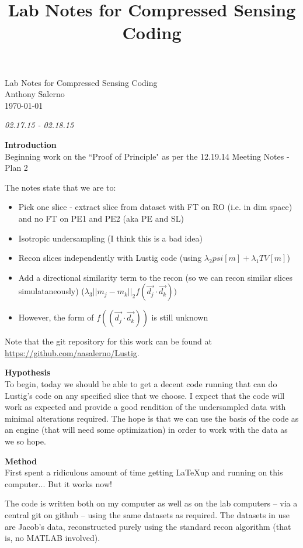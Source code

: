 \documentclass[pra,11 pt]{revtex4-1}
\title{Lab Notes for Compressed Sensing Coding}
\newcommand{\bo}{\noindent\textbf}
\begin{document}
\vfill

  \begin{titlepage}
    \vspace*{\fill}
    \begin{center}
      {\huge {Lab Notes for Compressed Sensing Coding}}\\[0.5cm]
      {\large {Anthony Salerno}}\\[0.4cm]
      \today
    \end{center}
    \vspace*{\fill}
  \end{titlepage}

\clearpage
\newpage

\noindent \emph{02.17.15 - 02.18.15}

\bo{Introduction}\\
Beginning work on the ``Proof of Principle" as per the 12.19.14 Meeting Notes - Plan 2

The notes state that we are to:
\begin{itemize}
  \item Pick one slice - extract slice from dataset with FT on RO (i.e. in dim space) and no FT on PE1 and PE2 (aka PE and SL)
  \item Isotropic undersampling (I think this is a bad idea)
  \item Recon slices independently with Lustig code (using $\lambda_2 psi[m] + \lambda_1 TV[m]$)
  \item Add a directional similarity term to the recon (so we can recon similar slices simulataneously) ($\lambda_3 ||m_j - m_k||_2 f(\vec{d_j} \cdot \vec{d_k}))$
  \item However, the form of $f((\vec{d_j}\cdot \vec{d_k}))$ is still unknown
\end{itemize}

\noindent Note that the git repository for this work can be found at \url{https://github.com/aasalerno/Lustig}.


\bo{Hypothesis}\\
To begin, today we should be able to get a decent code running that can do Lustig's code on any specified slice that we choose. I expect that the code will work as expected and provide a good rendition of the undersampled data with minimal alterations required. The hope is that we can use the basis of the code as an engine (that will need some optimization) in order to work with the data as we so hope.


\bo{Method}\\
First spent a ridiculous amount of time getting \LaTeX up and running on this computer... But it works now! 

The code is written both on my computer as well as on the lab computers -- via a central git on github -- using the same datasets as required. The datasets in use are Jacob's data, reconstructed purely using the standard recon algorithm (that is, no MATLAB involved).
\end{document}
